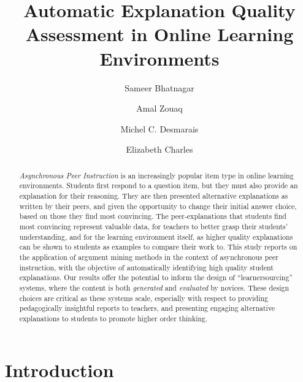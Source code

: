 \documentclass[runningheads]{llncs}
\begin{document}
%
\title{Automatic Explanation Quality Assessment in Online Learning Environments}
%
\author{Sameer Bhatnagar \and
Amal Zouaq \and
Michel C. Desmarais \and
Elizabeth Charles
}
%

%
\maketitle              %
%
\begin{abstract}
\textit{Asynchronous Peer Instruction} is an increasingly popular item type in 
online learning environments. Students first respond to a question item, but 
they must also provide an explanation for their reasoning. 
They are then presented alternative explanations as written by their peers, and 
given the opportunity to change their initial answer choice, based on those 
they find most convincing. 
The peer-explanations that students find most convincing represent valuable 
data, for teachers to better grasp their students' understanding, and for the 
learning environment itself, as higher quality explanations can be shown to 
students as examples to compare their work to. 
This study reports on the application of argument mining methods in the 
context of asynchronous peer instruction, with the objective of automatically 
identifying high quality student explanations. 
Our results offer the potential to inform the design of ``learnersourcing'' 
systems, where the content is both \textit{generated} and \textit{evaluated} by 
novices. 
These design choices are critical as these systems scale, especially with 
respect to providing pedagogically insightful reports to teachers, and 
presenting engaging alternative explanations to students to promote higher 
order thinking. 

\end{abstract}

\section{Introduction}

\end{document}
